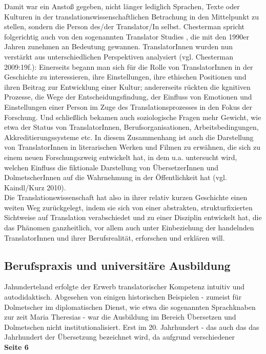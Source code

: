 \documentclass{article}
\begin{document}
	Damit war ein Anstoß gegeben, nicht länger lediglich Sprachen, Texte oder Kulturen in der translationswissenschaftlichen Betrachung in den Mittelpunkt zu stellen, sondern die Person des/der Translator/In selbst. Chesterman spricht folgerichtig auch von den sogenannten \glqq Translator Studies\grqq \: , die mit den 1990er Jahren zunehmen an Bedeutung gewannen. TranslatorInnen wurden nun verstärkt aus unterschiedlichen Perspektiven analysiert (vgl. Chesterman 2009:19f.): Einerseits begann man sich für die Rolle von TranslatorInnen in der Geschichte zu interessieren, ihre Einstellungen, ihre ethischen Positionen und ihren Beitrag zur Entwicklung einer Kultur; andererseits rückten die kgnitiven Prozesse, die Wege der Entscheidungsfindung, der Einfluss von Emotionen und Einstellungen einer Person im Zuge des Translationsprozesses in den Fokus der Forschung. Und schließlich bekamen auch soziologische Fragen mehr Gewicht, wie etwa der Status von TranslatorInnen, Berufsorganisationen, Arbeitsbedingungen, Akkreditierungssysteme etc. In diesem Zusammenhang ist auch die Darstellung von TranslatorInnen in literarischen Werken und Filmen zu erwähnen, die sich zu einem neuen Forschungszweig entwickelt hat, in dem u.a. untersucht wird, welchen Einfluss die fiktionale Darstellung von ÜbersetzerInnen und DolmetscherInnen auf die Wahrnehmung in der Öffentlichkeit hat (vgl. Kaindl/Kurz 2010). \\
	Die Translationswissenschaft hat also in ihrer relativ kurzen Geschichte einen weiten Weg zurückgelegt, indem sie sich von einer abstrakten, strukturfixierten Sichtweise auf Translation verabschiedet und zu einer Disziplin entwickelt hat, die das Phänomen ganzheitlich, vor allem auch unter Einbeziehung der handelnden TranslatorInnen und ihrer Berufsrealität, erforschen und erklären will.
	\subsection*{Berufspraxis und universitäre Ausbildung}
	Jahunderteland erfolgte der Erwerb translatorischer Kompetenz intuitiv und autodidaktisch. Abgesehen von einigen historischen Beispielen - zumeist für Dolmetscher im diplomatischen Dienst, wie etwa die sogenannten \glqq Sprachknaben\grqq \: zur zeit Maria Theresias - war die Ausbildung im Bereich Übersetzen und Dolmetschen nicht institutionalisiert. Erst im 20. Jahrhundert - das auch das das Jahrhundert der Übersetzung bezeichnet wird, da aufgrund verschiedener \\
	\textbf{Seite 6} \\
\end{document}
